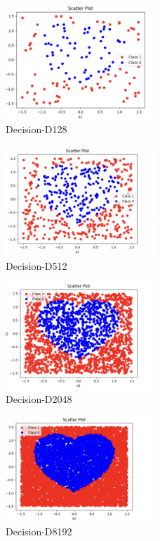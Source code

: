 \documentclass[a4paper]{article}
\theoremstyle{definition}
\begin{document}
\begin{enumerate}
\begin{figure}[htbp]
  \centering
  \includegraphics[width=0.5\textwidth]{D128.png}
  \caption{Decision-D128}
  \label{fig:Decision_D128}
\end{figure}

\begin{figure}[htbp]
  \centering
  \includegraphics[width=0.5\textwidth]{D512.png}
  \caption{Decision-D512}
  \label{fig:Decision_D512}
\end{figure}

\begin{figure}[htbp]
  \centering
  \includegraphics[width=0.5\textwidth]{D2048.png}
  \caption{Decision-D2048}
  \label{fig:Decision_D2048}
\end{figure}

\begin{figure}[htbp]
  \centering
  \includegraphics[width=0.5\textwidth]{D8192.png}
  \caption{Decision-D8192}
  \label{fig:Decision_D8192}
\end{figure}


\end{enumerate}
\end{document}
